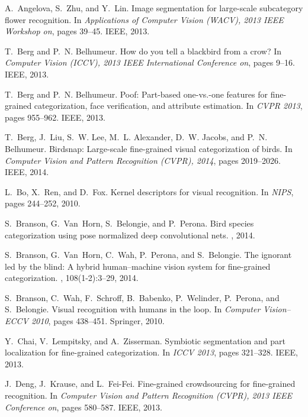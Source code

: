 \documentclass[10pt,twocolumn,letterpaper]{article}
\begin{document}
\begin{thebibliography}{10}\itemsep=-1pt

A.~Angelova, S.~Zhu, and Y.~Lin.
\newblock Image segmentation for large-scale subcategory flower recognition.
\newblock In {\em Applications of Computer Vision (WACV), 2013 IEEE Workshop
  on}, pages 39--45. IEEE, 2013.

T.~Berg and P.~N. Belhumeur.
\newblock How do you tell a blackbird from a crow?
\newblock In {\em Computer Vision (ICCV), 2013 IEEE International Conference
  on}, pages 9--16. IEEE, 2013.

T.~Berg and P.~N. Belhumeur.
\newblock Poof: Part-based one-vs.-one features for fine-grained
  categorization, face verification, and attribute estimation.
\newblock In {\em CVPR 2013}, pages 955--962. IEEE, 2013.

T.~Berg, J.~Liu, S.~W. Lee, M.~L. Alexander, D.~W. Jacobs, and P.~N. Belhumeur.
\newblock Birdsnap: Large-scale fine-grained visual categorization of birds.
\newblock In {\em Computer Vision and Pattern Recognition (CVPR), 2014}, pages
  2019--2026. IEEE, 2014.

L.~Bo, X.~Ren, and D.~Fox.
\newblock Kernel descriptors for visual recognition.
\newblock In {\em NIPS}, pages 244--252, 2010.

S.~Branson, G.~Van~Horn, S.~Belongie, and P.~Perona.
\newblock Bird species categorization using pose normalized deep convolutional
  nets.
, 2014.

S.~Branson, G.~Van~Horn, C.~Wah, P.~Perona, and S.~Belongie.
\newblock The ignorant led by the blind: A hybrid human--machine vision system
  for fine-grained categorization.
, 108(1-2):3--29, 2014.

S.~Branson, C.~Wah, F.~Schroff, B.~Babenko, P.~Welinder, P.~Perona, and
  S.~Belongie.
\newblock Visual recognition with humans in the loop.
\newblock In {\em Computer Vision--ECCV 2010}, pages 438--451. Springer, 2010.

Y.~Chai, V.~Lempitsky, and A.~Zisserman.
\newblock Symbiotic segmentation and part localization for fine-grained
  categorization.
\newblock In {\em ICCV 2013}, pages 321--328. IEEE, 2013.

J.~Deng, J.~Krause, and L.~Fei-Fei.
\newblock Fine-grained crowdsourcing for fine-grained recognition.
\newblock In {\em Computer Vision and Pattern Recognition (CVPR), 2013 IEEE
  Conference on}, pages 580--587. IEEE, 2013.


\end{thebibliography}
\end{document}
